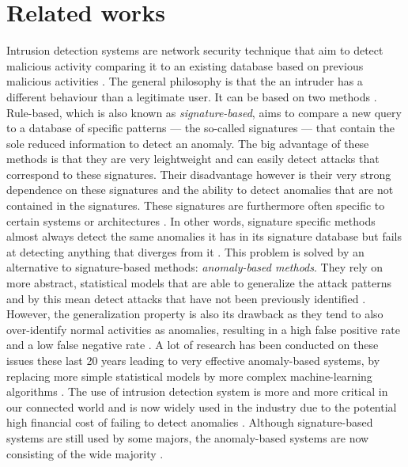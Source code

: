 \section{Related works}
Intrusion detection systems are network security technique that aim to detect malicious activity comparing it to an existing database based on previous malicious activities \cite{Amudhavel2016AReview}. The general philosophy is that the an intruder has a different behaviour than a legitimate user. It can be based on two methods \cite{Winter2018}. Rule-based, which is also known as \emph{signature-based}, aims to compare a new query to a database of specific patterns --- the so-called signatures --- that contain the sole reduced information to detect an anomaly. The big advantage of these methods is that they are very leightweight and can easily detect attacks that correspond to these signatures. Their disadvantage however is their very strong dependence on these signatures and the ability to detect anomalies that are not contained in the signatures. These signatures are furthermore often specific to certain systems or architectures \cite{Ilgun1995StateApproach}. In other words, signature specific methods almost always detect the same anomalies it has in its signature database but fails at detecting anything that diverges from it \cite{Liao2013IntrusionReview}. This problem is solved by an alternative to signature-based methods: \emph{anomaly-based methods}. They rely on more abstract, statistical models that are able to generalize the attack patterns and by this mean detect attacks that have not been previously identified \cite{Dali2015ASystem}. However, the generalization property is also its drawback as they tend to also over-identify normal activities as anomalies, resulting in a high false positive rate and a low false negative rate \cite{Mukherjee1994NetworkDetection}. A lot of research has been conducted on these issues these last 20 years leading to very effective anomaly-based systems, by replacing more simple statistical models by more complex machine-learning algorithms \cite{Tsai2010ADetection}. The use of intrusion detection system is more and more critical in our connected world and is now widely used in the industry \cite{Bhatt2014TheSystems} due to the potential high financial cost of failing to detect anomalies \cite{Rossi2009UnderstandingSignaling}. Although signature-based systems are still used by some majors, the anomaly-based systems are now consisting of the wide majority \cite{Rubio2017AnalysisEcosystems}.

